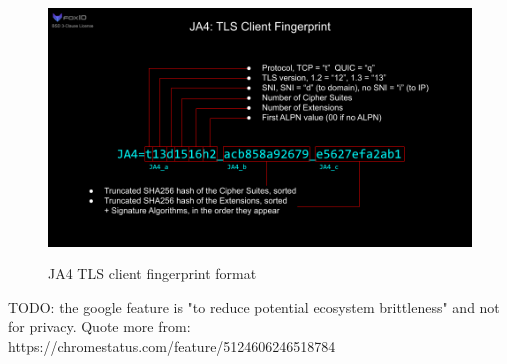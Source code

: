 \documentclass[12pt]{scrbook}
\begin{document}
\begin{figure}[!htb] \centering
  \includegraphics[height=7cm]{./images/JA4.png} \caption{JA4 TLS client
fingerprint format} \end{figure}

TODO: the google feature is "to reduce potential ecosystem brittleness" and
not for privacy. Quote more from:
https://chromestatus.com/feature/5124606246518784
\end{document}
